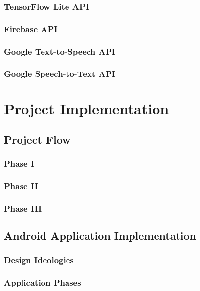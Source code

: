 \documentclass[14pt]{report}
\begin{document}
			\subsection{TensorFlow Lite API}
			\subsection{Firebase API}
			\subsection{Google Text-to-Speech API}
			\subsection{Google Speech-to-Text API}

	\newpage


	\chapter{Project Implementation}\label{chapter4}
		
	

		\section{Project Flow}
			\subsection{Phase I}
			\subsection{Phase II}
			\subsection{Phase III}

		\section{Android Application Implementation}
			\subsection{Design Ideologies}
			\subsection{Application Phases}
\end{document}
